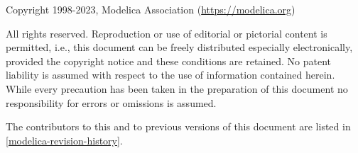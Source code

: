 Copyright \textcopyright{} 1998-2023, Modelica Association (\url{https://modelica.org})

All rights reserved.
Reproduction or use of editorial or pictorial content is permitted, i.e., this document can be freely distributed especially electronically, provided the copyright notice and these conditions are retained.
No patent liability is assumed with respect to the use of information contained herein.
While every precaution has been taken in the preparation of this document no responsibility for errors or omissions is assumed.

The contributors to this and to previous versions of this document are listed in \cref{modelica-revision-history}.
